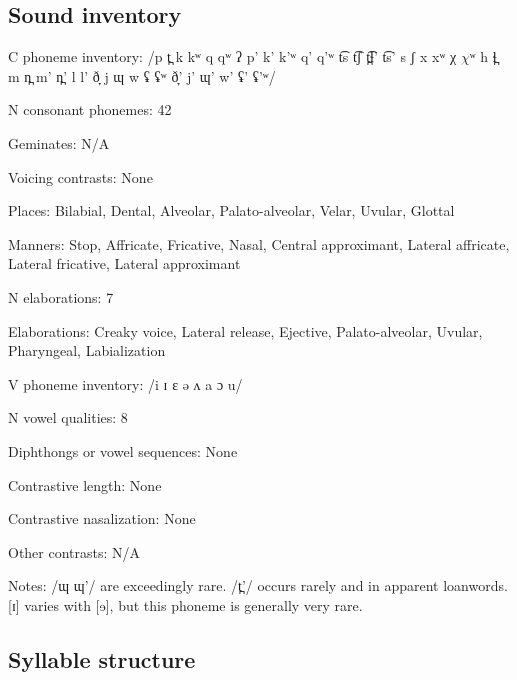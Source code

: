 {\subsection*{Sound inventory}
\begin{appendixdesc}

\item[C phoneme inventory:] /p t̪ k kʷ q qʷ ʔ p’ k’ k’ʷ q’ q’ʷ t͡s t͡ʃ t̪͡ɬ’ t͡s’ s ʃ x xʷ χ $\chi ʷ$ h ɬ̪ m n̪ m’ n̪’ l l’ ð̞ j ɰ w ʢ ʢʷ ð̞’ j’ ɰ’ w’ ʢ’ ʢ’ʷ/

\item[N consonant phonemes:] 42

\item[Geminates:] N/A

\item[Voicing contrasts:] None

\item[Places:] Bilabial, Dental, Alveolar, Palato-alveolar, Velar, Uvular, Glottal 

\item[Manners:] Stop, Affricate, Fricative, Nasal, Central approximant, Lateral affricate, Lateral fricative, Lateral approximant

\item[N elaborations:] 7

\item[Elaborations:] Creaky voice, Lateral release, Ejective, Palato-alveolar, Uvular, Pharyngeal, Labialization

\item[V phoneme inventory:] /i ɪ ɛ ə ʌ a ɔ u/

\item[N vowel qualities:] 8

\item[Diphthongs or vowel sequences:] None

\item[Contrastive length:] None

\item[Contrastive nasalization:] None

\item[Other contrasts:] N/A

\item[Notes:] /ɰ ɰ’/ are exceedingly rare. /t̪’/ occurs rarely and in apparent loanwords. [ɪ] varies with [ɘ], but this phoneme is generally very rare.
\end{appendixdesc}
\subsection*{Syllable structure}
\begin{appendixdesc}


\end{appendixdesc}}
